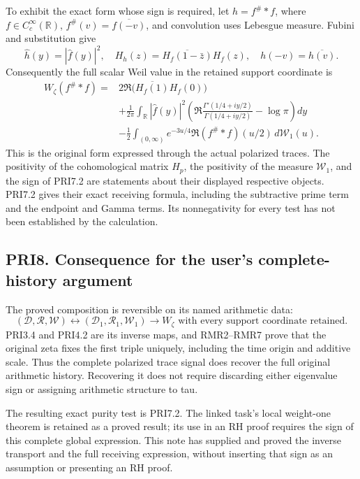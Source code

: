\documentclass[
]{article}
\begin{document}
To exhibit the exact form whose sign is required, let \(h=f^\#*f\),
where \(f\in C_c^\infty(\mathbb R)\), \(f^\#(v)=\overline{f(-v)}\), and
convolution uses Lebesgue measure. Fubini and substitution give \[
\widehat h(y)=|\widehat f(y)|^2,\quad
H_h(z)=\overline{H_f(1-\bar z)}H_f(z),\quad h(-v)=\overline{h(v)}.
\] Consequently the full scalar Weil value in the retained support
coordinate is \[
\begin{split}
W_\zeta(f^\#*f)
={}&2\Re\bigl(\overline{H_f(1)}H_f(0)\bigr)\\
&+\frac1{2\pi}\int_{\mathbb R}|\widehat f(y)|^2
\left(\Re\frac{\Gamma'(1/4+iy/2)}{\Gamma(1/4+iy/2)}-\log\pi\right)dy\\
&-\frac12\int_{(0,\infty)}e^{-3u/4}\Re(f^\#*f)(u/2)\,d\mathcal W_1(u).
\end{split}
\tag{PRI7.2}
\] This is the original form expressed through the actual polarized
traces. The positivity of the cohomological matrix \(H_p\), the
positivity of the measure \(\mathcal W_1\), and the sign of PRI7.2 are
statements about their displayed respective objects. PRI7.2 gives their
exact receiving formula, including the subtractive prime term and the
endpoint and Gamma terms. Its nonnegativity for every test has not been
established by the calculation.

\subsection{PRI8. Consequence for the user's complete-history
argument}\label{pri8.-consequence-for-the-users-complete-history-argument}

The proved composition is reversible on its named arithmetic data: \[
(\mathcal D,\mathcal R,\mathcal W)
\longleftrightarrow(\mathcal D_1,\mathcal R_1,\mathcal W_1)
\longrightarrow W_\zeta\text{ with every support coordinate retained}.
\tag{PRI8.1}
\] PRI3.4 and PRI4.2 are its inverse maps, and RMR2--RMR7 prove that the
original zeta fixes the first triple uniquely, including the time origin
and additive scale. Thus the complete polarized trace signal does
recover the full original arithmetic history. Recovering it does not
require discarding either eigenvalue sign or assigning arithmetic
structure to tau.

The resulting exact purity test is PRI7.2. The linked task's local
weight-one theorem is retained as a proved result; its use in an RH
proof requires the sign of this complete global expression. This note
has supplied and proved the inverse transport and the full receiving
expression, without inserting that sign as an assumption or presenting
an RH proof.
\end{document}
